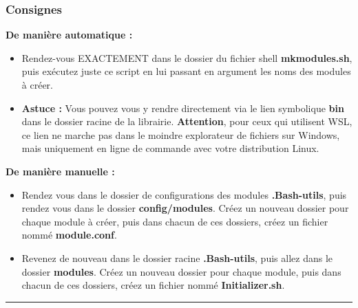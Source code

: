 \documentclass[a4paper,10pt]{article}
\begin{document}
\color{blue}
\subsubsection{Consignes}\color{white}

\textbf{De manière automatique :}
\begin{itemize}
    \item Rendez-vous EXACTEMENT dans le dossier du fichier shell \textbf{\color{lime}mkmodules.sh}, puis exécutez juste\linebreak
    ce script en lui passant en argument les noms des modules à créer.\\[1\baselineskip]

    \item \textbf{Astuce :} Vous pouvez vous y rendre directement via le lien symbolique \textbf{\color{lime}bin} dans le dossier racine de la librairie. \textbf{Attention}, pour ceux qui utilisent WSL, ce lien ne marche pas dans le moindre explorateur de fichiers sur Windows, mais uniquement en ligne de commande avec votre distribution Linux.\\[1\baselineskip]
\end{itemize}

\textbf{De manière manuelle :}
\begin{itemize}
    \item  Rendez vous dans le dossier de configurations des modules \textbf{\color{lime}.Bash-utils}, puis rendez vous dans
    le dossier \textbf{\color{lime}config/modules}. Créez un nouveau dossier pour chaque module à créer, puis dans chacun de ces dossiers, créez un fichier nommé \textbf{\color{lime}module.conf}.\\[1\baselineskip]

    \item Revenez de nouveau dans le dossier racine \textbf{\color{lime}.Bash-utils}, puis allez dans le dossier \textbf{\color{lime}modules}.\linebreak
    Créez un nouveau dossier pour chaque module, puis dans chacun de ces dossiers, créez un fichier nommé \textbf{\color{lime}Initializer.sh}.\\[1\baselineskip]
\end{itemize}




\color{green}\par\noindent\rule{\textwidth}{0.4pt}\color{white}
\end{document}
